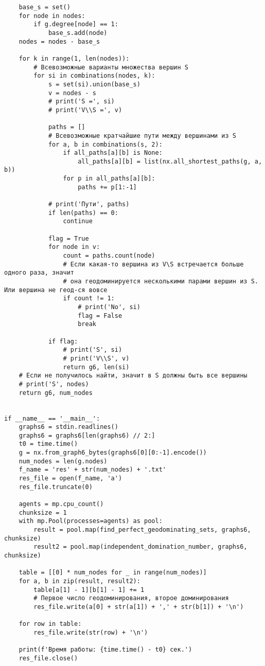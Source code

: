 \documentclass[bachelor, och, nir]{SCWorks}
\begin{document}
\begin{verbatim}
    base_s = set()
    for node in nodes:
        if g.degree[node] == 1:
            base_s.add(node)
    nodes = nodes - base_s

    for k in range(1, len(nodes)):
        # Всевозможные варианты множества вершин S
        for si in combinations(nodes, k):
            s = set(si).union(base_s)
            v = nodes - s
            # print('S =', si)
            # print('V\\S =', v)

            paths = []
            # Всевозможные кратчайшие пути между вершинами из S
            for a, b in combinations(s, 2):
                if all_paths[a][b] is None:
                    all_paths[a][b] = list(nx.all_shortest_paths(g, a, b))
                for p in all_paths[a][b]:
                    paths += p[1:-1]

            # print('Пути', paths)
            if len(paths) == 0:
                continue

            flag = True
            for node in v:
                count = paths.count(node)
                # Если какая-то вершина из V\S встречается больше одного раза, значит
                # она геодоминируется несколькими парами вершин из S. Или вершина не геод-ся вовсе
                if count != 1:
                    # print('No', si)
                    flag = False
                    break

            if flag:
                # print('S', si)
                # print('V\\S', v)
                return g6, len(si)
    # Если не получилось найти, значит в S должны быть все вершины
    # print('S', nodes)
    return g6, num_nodes


if __name__ == '__main__':
    graphs6 = stdin.readlines()
    graphs6 = graphs6[len(graphs6) // 2:]
    t0 = time.time()
    g = nx.from_graph6_bytes(graphs6[0][0:-1].encode())
    num_nodes = len(g.nodes)
    f_name = 'res' + str(num_nodes) + '.txt'
    res_file = open(f_name, 'a')
    res_file.truncate(0)

    agents = mp.cpu_count()
    chunksize = 1
    with mp.Pool(processes=agents) as pool:
        result = pool.map(find_perfect_geodominating_sets, graphs6, chunksize)
        result2 = pool.map(independent_domination_number, graphs6, chunksize)

    table = [[0] * num_nodes for _ in range(num_nodes)]
    for a, b in zip(result, result2):
        table[a[1] - 1][b[1] - 1] += 1
        # Первое число геодоминирования, второе доминирования
        res_file.write(a[0] + str(a[1]) + ',' + str(b[1]) + '\n')

    for row in table:
        res_file.write(str(row) + '\n')

    print(f'Время работы: {time.time() - t0} сек.')
    res_file.close()

    \end{verbatim}
\end{document}
